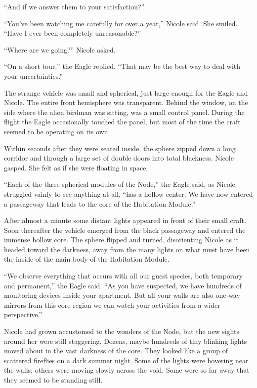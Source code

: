 \documentclass[]{article}
\begin{document}
{“And if we answer them to your satisfaction?”

“You’ve been watching me carefully for over a year,” Nicole said. She smiled. “Have I ever been completely unreasonable?”

“Where are we going?” Nicole asked.

“On a short tour,” the Eagle replied. “That may be the best way to deal with your uncertainties.”

The strange vehicle was small and spherical, just large enough for the Eagle and Nicole. The entire front hemisphere was transparent. Behind the window, on the side where the alien birdman was sitting, was a small control panel. During the flight the Eagle occasionally touched the panel, but most of the time the craft seemed to be operating on its own.

Within seconds after they were seated inside, the sphere zipped down a long corridor and through a large set of double doors into total blackness. Nicole gasped. She felt as if she were floating in space.

“Each of the three spherical modules of the Node,” the Eagle said, as Nicole struggled vainly to see anything at all, “has a hollow center. We have now entered a passageway that leads to the core of the Habitation Module.”

After almost a minute some distant lights appeared in front of their small craft. Soon thereafter the vehicle emerged from the black passageway and entered the immense hollow core. The sphere flipped and turned, disorienting Nicole as it headed toward the darkness, away from the many lights on what must have been the inside of the main body of the Habitation Module.

“We observe everything that occurs with all our guest species, both temporary and permanent,” the Eagle said. “As you have suspected, we have hundreds of monitoring devices inside your apartment. But all your walls are also one-way mirrors-from this core region we can watch your activities from a wider perspective.”

Nicole had grown accustomed to the wonders of the Node, but the new sights around her were still staggering. Dozens, maybe hundreds of tiny blinking lights moved about in the vast darkness of the core. They looked like a group of scattered fireflies on a dark summer night. Some of the lights were hovering near the walls; others were moving slowly across the void. Some were so far away that they seemed to be standing still.

}
\end{document}
